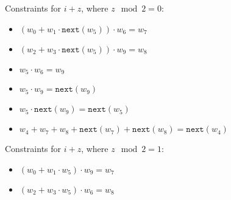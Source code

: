 Constraints for $i + z$, where $z\mod 2 = 0$:
\begin{itemize}
    \item $(w_0 + w_1 \cdot \texttt{next}(w_5)) \cdot w_6 = w_7$
    \item $(w_2 + w_3 \cdot \texttt{next}(w_5)) \cdot w_9 = w_8$
    \item $w_5 \cdot w_6 = w_9$
    \item $w_5 \cdot w_9 = \texttt{next}(w_9)$
    \item $w_5 \cdot \texttt{next}(w_9) = \texttt{next}(w_5)$
    \item $w_4 + w_7 + w_8 + \texttt{next}(w_7) + \texttt{next}(w_8) = \texttt{next}(w_4)$
\end{itemize}

Constraints for $i + z$, where $z\mod 2 = 1$:
\begin{itemize}
    \item $(w_0 + w_1 \cdot w_5) \cdot w_9 = w_7$
    \item $(w_2 + w_3 \cdot w_5) \cdot w_6 = w_8$
\end{itemize}